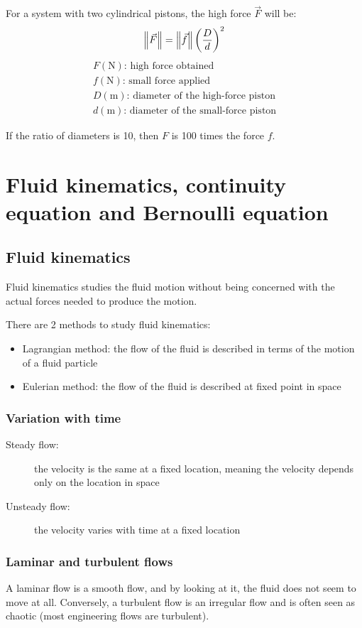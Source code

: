 \documentclass[10pt, twocolumn]{article}
\begin{document}
For a system with two cylindrical pistons, the high force \(\vec{F}\) will be:
\[
  \left\| \vec{F} \right\| = \left\| \vec{f} \right\| \left( \frac{D}{d} \right)^2
\]
\[
  \begin{array}{|l}
    F (\si{\newton}) \text{: high force obtained}              \\
    f (\si{\newton}) \text{: small force applied}              \\
    D (\si{\metre}) \text{: diameter of the high-force piston} \\
    d (\si{\metre}) \text{: diameter of the small-force piston}
  \end{array}
\]

\begin{example}
  If the ratio of diameters is 10, then \(F\) is 100 times the force \(f\).
\end{example}


\section{Fluid kinematics, continuity equation and Bernoulli equation}
\subsection{Fluid kinematics}
Fluid kinematics studies the fluid motion without being concerned with the actual forces needed to produce the motion.

There are 2 methods to study fluid kinematics:
\begin{itemize}
  \item Lagrangian method: the flow of the fluid is described in terms of the motion of a fluid particle
  \item Eulerian method: the flow of the fluid is described at fixed point in space
\end{itemize}


\subsubsection{Variation with time}
\begin{description}
  \item[Steady flow:] the velocity is the same at a fixed location, meaning the velocity depends only on the location in space
  \item[Unsteady flow:] the velocity varies with time at a fixed location
\end{description}


\subsubsection{Laminar and turbulent flows}
A laminar flow is a smooth flow, and by looking at it, the fluid does not seem to move at all.
Conversely, a turbulent flow is an irregular flow and is often seen as chaotic (most engineering flows are turbulent).
\end{document}

